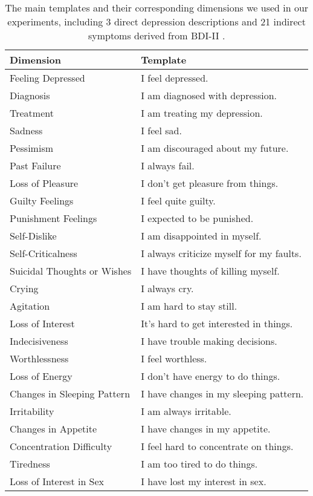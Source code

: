 \begin{table}
  \centering
  \small
  \begin{tabular}{l|l}
  \hline
  Dimension & Template \\
  \hline
  Feeling Depressed  &  I feel depressed. \\
  Diagnosis &  I am diagnosed with depression. \\
  Treatment &  I am treating my depression. \\
  \hline
  Sadness & I feel sad.  \\
  Pessimism & I am discouraged about my future.  \\
  Past Failure & I always fail. \\
  Loss of Pleasure & I don't get pleasure from things. \\
  Guilty Feelings & I feel quite guilty. \\
  Punishment Feelings & I expected to be punished. \\
  Self-Dislike & I am disappointed in myself. \\
  Self-Criticalness & I always criticize myself for my faults. \\
  Suicidal Thoughts or Wishes & I have thoughts of killing myself. \\
  Crying & I always cry. \\
  Agitation & I am hard to stay still. \\
  Loss of Interest & It's hard to get interested in things. \\
  Indecisiveness & I have trouble making decisions. \\
  Worthlessness & I feel worthless. \\
  Loss of Energy & I don't have energy to do things. \\
  Changes in Sleeping Pattern & I have changes in my sleeping pattern. \\
  Irritability & I am always irritable. \\
  Changes in Appetite & I have changes in my appetite. \\
  Concentration Difficulty & I feel hard to concentrate on things. \\
  Tiredness  & I am too tired to do things. \\
  Loss of Interest in Sex & I have lost my interest in sex. \\
  \hline
  \end{tabular}
  \caption{\label{tab:BDI-II} The main templates and their corresponding dimensions we used in our experiments, including 3 direct depression descriptions and 21 indirect symptoms derived from BDI-II \citep{beck1996beck}. }
\end{table}


